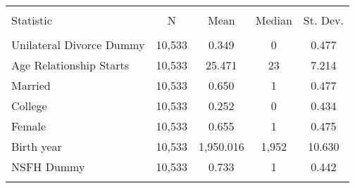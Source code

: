 
\begin{tabular}{@{\extracolsep{5pt}}lcccc} 
\\[-1.8ex]\hline 
\hline \\[-1.8ex] 
Statistic & \multicolumn{1}{c}{N} & \multicolumn{1}{c}{Mean} & \multicolumn{1}{c}{Median} & \multicolumn{1}{c}{St. Dev.} \\ 
\hline \\[-1.8ex] 
Unilateral Divorce Dummy & 10,533 & 0.349 & 0 & 0.477 \\ 
Age Relationship Starts & 10,533 & 25.471 & 23 & 7.214 \\ 
Married & 10,533 & 0.650 & 1 & 0.477 \\ 
College & 10,533 & 0.252 & 0 & 0.434 \\ 
Female & 10,533 & 0.655 & 1 & 0.475 \\ 
Birth year & 10,533 & 1,950.016 & 1,952 & 10.630 \\ 
NSFH Dummy & 10,533 & 0.733 & 1 & 0.442 \\ 
\hline \\[-1.8ex] 
\end{tabular} 
